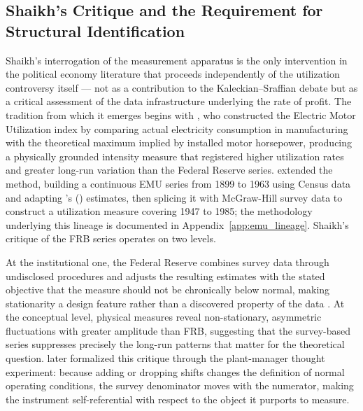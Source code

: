 \documentclass[11pt,a4paper]{article}
\begin{document}

\subsection{Shaikh's Critique and the Requirement for Structural Identification}
\label{sec:24_shaikh_structuralid}


Shaikh's interrogation of the measurement apparatus is the only intervention
in the political economy literature that proceeds independently of the
utilization controversy itself --- not as a contribution to the
Kaleckian--Sraffian debate but as a critical assessment of the data
infrastructure underlying the rate of profit. The tradition from which it
emerges begins with \citet{Foss1963}, who constructed the Electric Motor
Utilization index by comparing actual electricity consumption in
manufacturing with the theoretical maximum implied by installed motor
horsepower, producing a physically grounded intensity measure that registered
higher utilization rates and greater long-run variation than the Federal
Reserve series. \citet{Shaikh1992} extended the method, building a
continuous EMU series from 1899 to 1963 using Census data and adapting
\citeauthor{Christensen1969}'s (\citeyear{Christensen1969}) estimates, then
splicing it with McGraw-Hill survey data to construct a utilization measure
covering 1947 to 1985; the methodology underlying this lineage is
documented in Appendix~\ref{app:emu_lineage}. Shaikh's critique of the FRB
series operates on two levels. 

At the institutional one, the Federal
Reserve combines survey data through undisclosed procedures and adjusts the
resulting estimates with the stated objective that the measure should not be
chronically below normal, making stationarity a design feature rather than a
discovered property of the data \citep[pp.~187--188]{Shapiro1989}. At the
conceptual level, physical measures reveal non-stationary, asymmetric
fluctuations with greater amplitude than FRB, suggesting that the
survey-based series suppresses precisely the long-run patterns that matter
for the theoretical question. \citet{Nikiforos2016} later formalized this
critique through the plant-manager thought experiment: because adding or
dropping shifts changes the definition of normal operating conditions, the
survey denominator moves with the numerator, making the instrument
self-referential with respect to the object it purports to measure.
\end{document}
